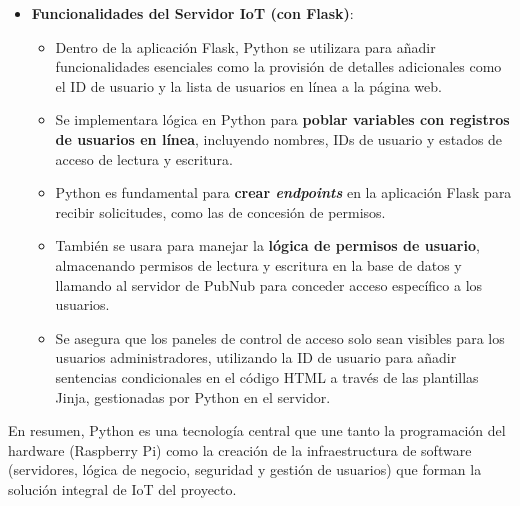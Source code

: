 \documentclass{report}
\begin{document}
\begin{itemize}
    \item \textbf{Funcionalidades del Servidor IoT (con Flask)}:
    \begin{itemize}
        \item Dentro de la aplicación Flask, Python se utilizara para añadir funcionalidades esenciales como la provisión de detalles 
        adicionales como el ID de usuario y la lista de usuarios en línea a la página web.
        \item Se implementara lógica en Python para \textbf{poblar variables con registros de usuarios en línea}, incluyendo nombres, 
        IDs de usuario y estados de acceso de lectura y escritura.
        \item Python es fundamental para \textbf{crear \textit{endpoints}} en la aplicación Flask para recibir solicitudes, como las 
        de concesión de permisos.
        \item También se usara para manejar la \textbf{lógica de permisos de usuario}, almacenando permisos de lectura y escritura en la 
        base de datos y llamando al servidor de PubNub para conceder acceso específico a los usuarios.
        \item Se asegura que los paneles de control de acceso solo sean visibles para los usuarios administradores, utilizando la ID 
        de usuario para añadir sentencias condicionales en el código HTML a través de las plantillas Jinja, gestionadas por Python en 
        el servidor.
    \end{itemize}
\end{itemize}
En resumen, Python es una tecnología central que une tanto la programación del hardware (Raspberry Pi) como la creación de la 
infraestructura de software (servidores, lógica de negocio, seguridad y gestión de usuarios) que forman la solución integral 
de IoT del proyecto.
\end{document}
